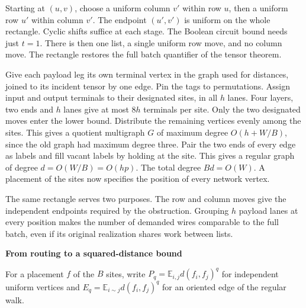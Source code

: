 \documentclass[11pt,letterpaper]{article}
\newcommand{\heading}[1]{{\noindent\LARGE\bfseries #1\par}\vspace{2pt}}
\newcommand{\subhead}[1]{\par\smallskip{\noindent\large\bfseries #1\par}\vspace{-2pt}}
\newcommand{\E}{\mathbb E}
\begin{document}
\begin{center}
\end{center}
Starting at \((u,v)\), choose a uniform column \(v'\) within row \(u\),
then a uniform row \(u'\) within column \(v'\). The endpoint \((u',v')\)
is uniform on the whole rectangle. Cyclic shifts suffice at each stage.
The Boolean circuit bound needs just \(t=1\). There is then one list, a single
uniform row move, and no column move. The rectangle restores the full batch
quantifier of the tensor theorem.

\subhead{Turn the wires into a regular graph}
Give each payload leg its own terminal vertex in the graph used for distances,
joined to its incident tensor by one edge. Pin the tags to permutations.
Assign input and output terminals to their designated sites, in all \(h\)
lanes. Four layers, two ends and \(h\) lanes give at most \(8h\) terminals
per site. Only the two designated moves enter the lower bound.
Distribute the remaining vertices evenly among the sites. This gives a
quotient multigraph \(G\) of maximum degree \(O(h+W/B)\), since the old
graph had maximum degree three. Pair the two ends of every edge as labels
and fill vacant labels by holding at the site. This gives a regular graph
of degree \(d=O(W/B)=O(hp)\). The total degree \(Bd=O(W)\).
A placement of the sites now specifies the position of every network vertex.

The same rectangle serves two purposes. The row and column moves give the
independent endpoints required by the obstruction. Grouping \(h\) payload
lanes at every position makes the number of demanded wires comparable to
the full batch, even if its original realization shares work between lists.

\newpage
\heading{From routing to a squared-distance bound}
For a placement \(f\) of the \(B\) sites, write \(P_q=\E_{i,j}d(f_i,f_j)^q\)
for independent uniform vertices and \(E_q=\E_{i\sim j}d(f_i,f_j)^q\)
for an oriented edge of the regular walk.
\end{document}
